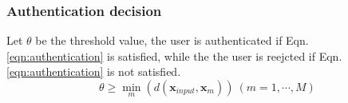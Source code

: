 \documentclass[sigchi,authordraft]{acmart}
\begin{document}



\subsubsection{Authentication decision}
Let $\theta$ be the threshold value, the user is authenticated if Eqn. \ref{eqn:authentication} is satisfied, while the the user is reejcted if Eqn. \ref{eqn:authentication} is not satisfied.
\begin{equation}
\label{eqn:authentication}
  \theta \geq \min_m(d(\bm{x}_{input},\bm{x}_m))~(m=1,\cdots,M)
\end{equation}

\end{document}
